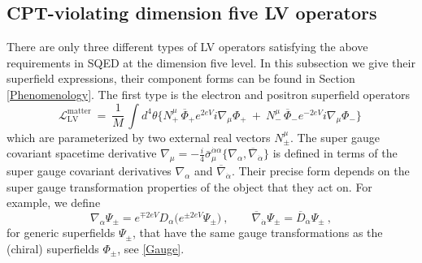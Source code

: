 \documentclass[12pt]{revtex4}
\begin{document}
\subsection{CPT-violating dimension five LV operators}
\label{Dim5LV}


There are only three different types of LV operators satisfying the 
above requirements in SQED at the
dimension five level. In this subsection we give their superfield
expressions, their component forms can be found in Section
\ref{Phenomenology}. The first type is the electron and positron 
superfield operators  
\begin{equation}
\label{LV_matter}
  \mathcal{L}_{\mathrm{LV}}^{\mathrm{matter}} ~=~ 
\frac{1}{M}\,   \int d^4\theta \Big\{ 
N_+^\mu\, \overline{\Phi}_+ e^{2eV} i \nabla_\mu \Phi_+ 
~+~ N_{-}^\mu\, \overline{\Phi}_- e^{-2eV} i \nabla_\mu  {\Phi}_-
                 \Big\}~
\end{equation}
which are parameterized by two external real vectors $N_\pm^\mu$.  
The super gauge covariant spacetime derivative 
$\nabla_\mu   =  - \frac{i}{4} 
\bar{\sigma}_\mu^{\dot{\alpha}\alpha}
\{ \nabla_\alpha, \overline{\nabla}_{\dot{\alpha}} \} 
$ 
is defined in terms of the super gauge covariant derivatives 
$\nabla_\alpha$ and $\overline{\nabla}_{\dot{\alpha}}$. Their precise
form depends on the super gauge transformation properties of the
object that they act on. For example, we define 
\begin{equation}
\nabla_\alpha \Psi_\pm = 
e^{\mp 2eV} D_\alpha \big( e^{\pm 2eV} \Psi_\pm \big)~, 
\qquad 
\overline{\nabla}_{\dot{\alpha}} \Psi_\pm =
\overline{D}_{\dot{\alpha}} \Psi_\pm~,
\end{equation} 
for generic superfields $\Psi_\pm$, that have the same gauge
transformations as the (chiral) superfields $\Phi_\pm$, see 
\eqref{Gauge}. 
\end{document}
